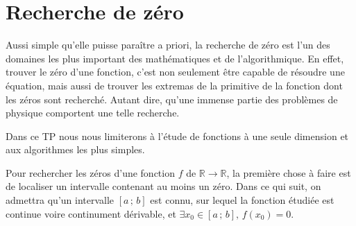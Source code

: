 \section{Recherche de zéro}
Aussi simple qu'elle puisse paraître a priori, la recherche de zéro est
l'un des domaines les plus important des mathématiques et de l'algorithmique. 
En effet, trouver le zéro d'une fonction, c'est non seulement 
être capable de résoudre une équation, mais aussi de trouver 
les extremas de la primitive de la fonction dont les zéros sont recherché. 
Autant dire, qu'une immense partie des problèmes de physique comportent 
une telle recherche.

Dans ce TP nous nous limiterons à l'étude de fonctions à une seule dimension et aux algorithmes les plus simples. 

Pour rechercher les zéros d'une 
fonction $f$ de $\mathbb{R}  \longrightarrow  \mathbb{R}$, 
la première chose à faire est  de localiser un intervalle contenant 
au moins un zéro. Dans ce qui suit, on admettra qu'un intervalle $[a\,;\,b]$
est connu, sur lequel la fonction étudiée est continue voire continument dérivable, et $\exists x_0 \in  [a\,;\,b], \, f(x_0)=0$.

